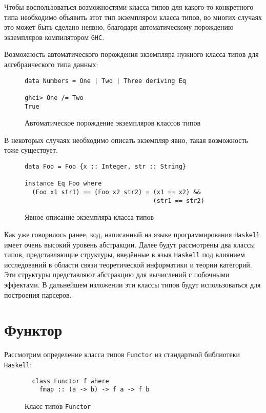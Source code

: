 Чтобы воспользоваться возможностями класса типов для какого-то конкретного типа
необходимо объявить этот тип экземпляром класса типов, во многих случаях это
может быть сделано неявно, благодаря автоматическому порождению экземпляров
компилятором \lstinline{GHC}.

Возможность автоматического порождения экземпляра нужного класса типов для
алгебраического типа данных:
\begin{figure}[h]
\begin{lstlisting}
data Numbers = One | Two | Three deriving Eq

ghci> One /= Two
True
\end{lstlisting}
\caption{Автоматическое порождение экземпляров классов типов}
\label{listing:List}
\end{figure}


В некоторых случаях необходимо описать экземпляр явно, такая возможность тоже
существует.

\begin{figure}[h]
\begin{lstlisting}
data Foo = Foo {x :: Integer, str :: String}

instance Eq Foo where
  (Foo x1 str1) == (Foo x2 str2) = (x1 == x2) &&
                                   (str1 == str2)
\end{lstlisting}
\caption{Явное описание экземпляра класса типов}
\label{listing:Instance}
\end{figure}

Как уже говорилось ранее, код, написанный на языке программирования
\lstinline{Haskell} имеет очень высокий уровень абстракции. Далее будут
рассмотрены два классы типов, представляющие структуры, введённые в язык
\lstinline{Haskell} под влиянием исследований в области связи теоретической
информатики и теории категорий. Эти структуры представляют абстракцию для
вычислений с побочными эффектами. В дальнейшем изложении эти классы типов будут
использоваться для построения парсеров.

\section{Функтор}

Рассмотрим определение класса типов \lstinline{Functor} из стандартной
библиотеки \lstinline{Haskell}:

\begin{figure}[h]
\begin{lstlisting}
  class Functor f where
    fmap :: (a -> b) -> f a -> f b
\end{lstlisting}
\caption{Класс типов \lstinline{Functor}}
\label{listing:Functor}
\end{figure}

